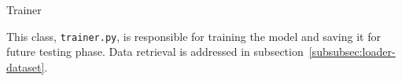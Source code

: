 \begin{section}{Trainer}
    \par This class, \texttt{trainer.py}, is responsible for training the model and saving it for future testing phase. Data retrieval is addressed in subsection~\ref{subsubsec:loader-dataset}.
    
\end{section}
\clearpage